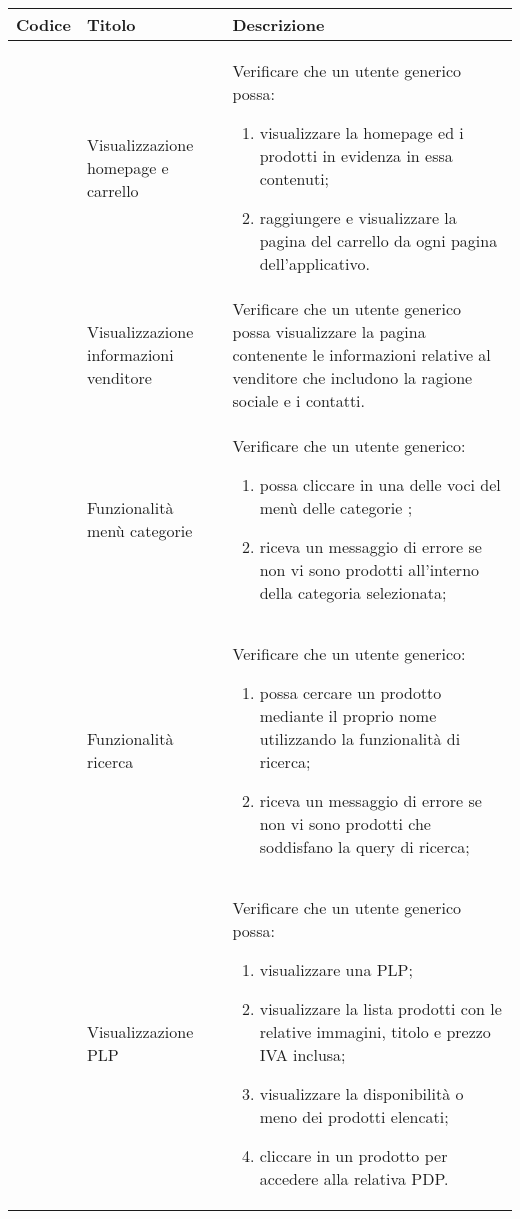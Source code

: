 \begin{center}
	\begin{longtable}{p{1cm}|p{6.85cm}|p{7cm}|}
	\hline
	\rowcolor{lighter-grayer}
	\textbf{Codice} & \textbf{Titolo} & \textbf{Descrizione} \\
	\hline
	\endfirsthead



	\hline
	
	 & Visualizzazione homepage e carrello & Verificare che un utente generico possa:
	\begin{enumerate}
		\item  visualizzare la homepage ed i prodotti in evidenza in essa contenuti;
		\item  raggiungere e visualizzare la pagina del carrello da ogni pagina dell'applicativo.
	\end{enumerate} \\

	 & Visualizzazione informazioni venditore & Verificare che un utente generico possa visualizzare la pagina contenente le informazioni relative al venditore che includono la ragione sociale e i contatti. \\

	 & Funzionalità menù categorie & Verificare che un utente generico: 
	\begin{enumerate}
		\item  possa cliccare in una delle voci del menù delle categorie ;
		\item  riceva un messaggio di errore se non vi sono prodotti all'interno della categoria selezionata;
	\end{enumerate} \\

	 & Funzionalità ricerca & Verificare che un utente generico: 
	\begin{enumerate}
		\item  possa cercare un prodotto mediante il proprio nome utilizzando la funzionalità di ricerca;
		\item  riceva un messaggio di errore se non vi sono prodotti che soddisfano la query di ricerca;
	\end{enumerate} \\


	 & Visualizzazione PLP & Verificare che un utente generico possa: 
	\begin{enumerate}
		\item  visualizzare una PLP;
		\item  visualizzare la lista prodotti con le relative immagini, titolo e prezzo IVA inclusa;
		\item  visualizzare la disponibilità o meno dei prodotti elencati;
		\item  cliccare in un prodotto per accedere alla relativa PDP.
	\end{enumerate} \\


\end{longtable}
\end{center}

